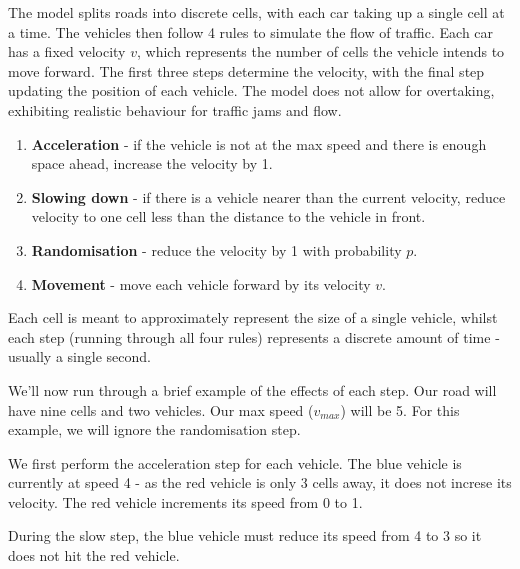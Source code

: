 \documentclass[ %
                    author={Alexander Hill},
                supervisor={Dr. Benjamin Sach},
                    degree={MEng},
                     title={MARMOSET},
                  subtitle={Multi-Agent Route Management using Online Simulation for Efficient Transportation},
                      type={research},
                      year={2016} ]{dissertation}
\begin{document}
The model splits roads into discrete cells, with each car taking up a single
cell at a time. The vehicles then follow 4 rules to simulate the flow of
traffic. Each car has a fixed velocity $v$, which represents the number of cells
the vehicle intends to move forward. The first three steps determine the
velocity, with the final step updating the position of each vehicle.  The model
does not allow for overtaking, exhibiting realistic behaviour for traffic jams
and flow.

\begin{enumerate}
    \item \textbf{Acceleration} - if the vehicle is not at the max speed and
        there is enough space ahead, increase the velocity by 1.
    \item \textbf{Slowing down} - if there is a vehicle nearer than the current
        velocity, reduce velocity to one cell less than the distance to the
        vehicle in front.
    \item \textbf{Randomisation} - reduce the velocity by 1 with probability
        $p$.
    \item \textbf{Movement} - move each vehicle forward by its velocity $v$.
\end{enumerate}

Each cell is meant to approximately represent the size of a single vehicle,
whilst each step (running through all four rules) represents a discrete amount
of time - usually a single second.

We'll now run through a brief example of the effects of each step. Our road will
have nine cells and two vehicles. Our max speed ($v_{max}$) will be 5.  For this
example, we will ignore the randomisation step.

\begin{figure}[!h]
\centering
{}
\end{figure}

We first perform the acceleration step for each vehicle. The blue vehicle
is currently at speed 4 - as the red vehicle is only 3 cells away, it does
not increse its velocity. The red vehicle increments its speed from 0 to 1.

During the slow step, the blue vehicle must reduce its speed from 4 to 3
so it does not hit the red vehicle.
\end{document}
